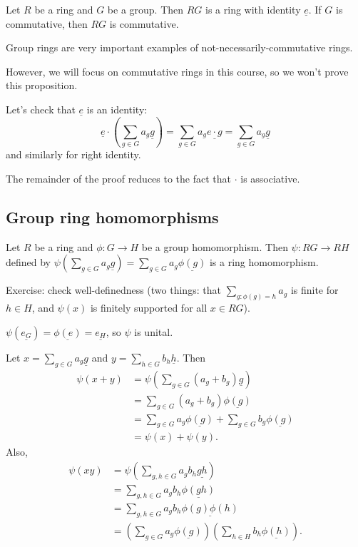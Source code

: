 \documentclass[12pt,letterpaper]{report}
\begin{document}
\begin{prop}{}{}
  Let $R$ be a ring and $G$ be a group.
  Then $RG$ is a ring with identity $\underline{e}$.
  If $G$ is commutative, then $RG$ is commutative.
\end{prop}

Group rings are very important examples of not-necessarily-commutative rings.

However, we will focus on commutative rings in this course, so we won't prove this proposition.

Let's check that $\underline{e}$ is an identity:
\[
  \underline{e} \cdot \left(\sum_{g \in G} a_g \underline{g}\right) =
    \sum_{g \in G} a_g \underline{e \cdot g} = \sum_{g \in G} a_g \underline{g}
\]
and similarly for right identity.

The remainder of the proof reduces to the fact that $\cdot$ is associative.

\pagebreak
\subsection{Group ring homomorphisms}

\begin{prop}{}{}
  Let $R$ be a ring and $\phi \colon G \to H$ be a group homomorphism.
  Then $\psi \colon RG \to RH$ defined by
  $\psi\left(\sum_{g \in G} a_g \underline{g}\right) = \sum_{g \in G} a_g \underline{\phi(g)}$ is a
  ring homomorphism.
\end{prop}

\begin{thmproof}
  Exercise: check well-definedness (two things: that $\sum_{g : \phi(g) = h} a_g$ is finite for
  $h \in H$, and $\psi(x)$ is finitely supported for all $x \in RG$).

  $\psi(\underline{e_G}) = \underline{\phi(e)} = \underline{e_H}$, so $\psi$ is unital.

  Let $x = \sum_{g \in G} a_g \underline{g}$ and $y = \sum_{h \in G} b_h \underline{h}$.
  Then
  \begin{align*}
    \psi(x + y)
    &= \psi\left(\sum_{g \in G} (a_g + b_g) \underline{g}\right) \\
    &= \sum_{g \in G} (a_g + b_g) \underline{\phi(g)} \\
    &= \sum_{g \in G} a_g \underline{\phi(g)} + \sum_{g \in G} b_g \underline{\phi(g)} \\
    &= \psi(x) + \psi(y).
  \end{align*}
  Also,
  \begin{align*}
    \psi(xy)
    &= \psi\left(\sum_{g, h \in G} a_g b_h \underline{gh}\right) \\
    &= \sum_{g, h \in G} a_g b_h \underline{\phi(gh)} \\
    &= \sum_{g, h \in G} a_g b_h \underline{\phi(g)\phi(h)} \\
    &= \left(\sum_{g \in G} a_g \underline{\phi(g)}\right)
      \left(\sum_{h \in H} b_h \underline{\phi(h)}\right).
  \end{align*}
\end{thmproof}

\end{document}
